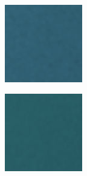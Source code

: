 \begin{figure}
\begin{subfigure}[t]{.24\textwidth}
      \end{subfigure}
    \hfill
    \begin{subfigure}[t]{.24\textwidth}
        \centering
        \includegraphics[width=\linewidth]{figures/mse-vgg-noise-no-resize-patch-single.png}
    \end{subfigure}
    \hfill
    \begin{subfigure}[t]{.24\textwidth}
        \centering
        \includegraphics[width=\linewidth]{figures/mse-noise-no-resize-patch-single.png}

\end{subfigure}
\end{figure}
